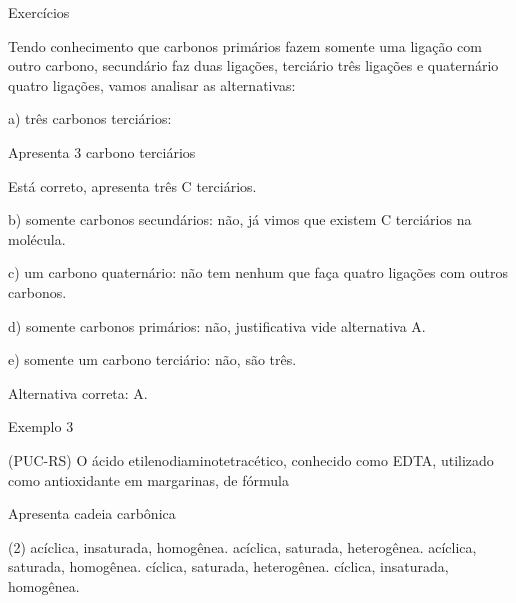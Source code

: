 \documentclass{beamer}
\begin{document}
\begin{frame}[label={sec:orgaa6c72b}]{Exercícios}
\begin{block}{}
\begin{answer}[print=true]
\small
Tendo conhecimento que carbonos primários fazem somente uma ligação com outro carbono, secundário faz duas ligações, terciário três ligações e quaternário quatro ligações, vamos analisar as alternativas:

a) três carbonos terciários:



Apresenta \alert{3 carbono terciários}

Está correto, apresenta três C terciários.

b) somente carbonos secundários: não, já vimos que existem C terciários na molécula.

c) um carbono quaternário: não tem nenhum que faça quatro ligações com outros carbonos.

d) somente carbonos primários: não, justificativa vide alternativa A.

e) somente um carbono terciário: não, são três.

Alternativa correta: \alert{A}.
\end{answer}
\end{block}

\begin{block}{Exemplo 3}
\begin{question}
(\alert{PUC-RS}) O ácido etilenodiaminotetracético, conhecido como \alert{EDTA}, utilizado como antioxidante em margarinas, de fórmula


Apresenta cadeia carbônica

\begin{choice}(2)
\choice acíclica, insaturada, homogênea.
\choice acíclica, saturada, heterogênea.
\choice acíclica, saturada, homogênea.
\choice cíclica, saturada, heterogênea.
\choice cíclica, insaturada, homogênea.
\end{choice}
\end{question}
\end{block}


\end{frame}
\end{document}
